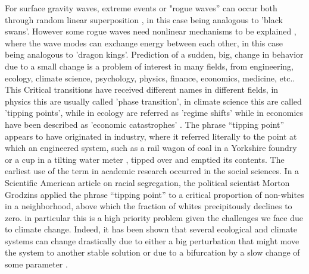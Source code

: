 For surface gravity waves, extreme events or "rogue waves'' can occur both through random linear superposition \citep{Fedele2016},  in this case being analogous to 'black swans'.
However some rogue waves need nonlinear mechanisms to be explained \citep{Onorato2021,2013PhR...528...47O}, where the wave modes can exchange energy between each other, in this case being analogous to 'dragon kings'. %
Prediction of a sudden, big, change in behavior due to a small change is a problem of interest in many fields, from engineering, ecology, climate science, psychology, physics, finance, economics, medicine, etc..  
%
This Critical transitions have received different names in different fields, in physics this are usually called 'phase transition', in climate science this are called 'tipping points', while in ecology are referred as 'regime shifts' while in economics have been described as 'economic catastrophes' \citep{Kopp2016, Feudel2018}.
%
The phrase “tipping point” appears to have originated in industry, where it referred literally to the point at which an engineered system, such as a rail wagon of coal in a Yorkshire foundry \cite{burnley1871} or a cup in a tilting water meter \cite{Hoadley1883}, tipped over and emptied its contents. The earliest use of the term in academic research occurred in the social sciences. In a Scientific American article on racial segregation, the political scientist Morton Grodzins applied the phrase “tipping point” to a critical proportion of non-whites in a neighborhood, above which the fraction of whites precipitously declines to zero.
%
in particular this is a high priority problem given the challenges we face due to climate change. Indeed, it has been shown that several ecological and climate systems can change drastically due to either a big perturbation that might move the system to another stable solution or due to a bifurcation by a slow change of some parameter \cite{Clements2018a, Bathiany2016, Lenton2011, McKay2022}. 

%

%
%
